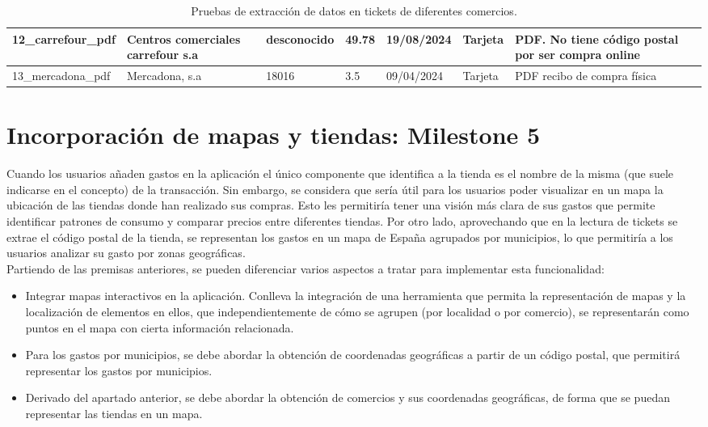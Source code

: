\begin{landscape}
\begin{table}[]
\begin{tabular}{|l|l|l|l|l|l|l|l|}
    12\_carrefour\_pdf & Centros comerciales carrefour s.a & desconocido & 49.78 & 19/08/2024 & Tarjeta & PDF. No tiene código postal por ser compra online &  \\ \hline
    13\_mercadona\_pdf & Mercadona, s.a & 18016 & 3.5 & 09/04/2024 & Tarjeta & PDF recibo de compra física &  \\ \hline
    \end{tabular}
    \caption{Pruebas de extracción de datos en tickets de diferentes comercios.}
    \label{tab:pruebas_extraccion_datos}
    \end{table}
    \end{landscape}
    


\section{Incorporación de mapas y tiendas: Milestone 5}
Cuando los usuarios añaden gastos en la aplicación el único componente que identifica a la tienda es el nombre de la misma (que suele indicarse en el concepto) de la transacción. Sin embargo, se considera que sería útil para los usuarios poder visualizar en un mapa la ubicación de las tiendas donde han realizado sus compras. Esto les permitiría tener una visión más clara de sus gastos que permite identificar patrones de consumo y comparar precios entre diferentes tiendas. Por otro lado, aprovechando que en la lectura de tickets se extrae el código postal de la tienda, se representan los gastos en un mapa de España agrupados por municipios, lo que permitiría a los usuarios analizar su gasto por zonas geográficas.\\

Partiendo de las premisas anteriores, se pueden diferenciar varios aspectos a tratar para implementar esta funcionalidad:

\begin{itemize}
    \item Integrar mapas interactivos en la aplicación. Conlleva la integración de una herramienta que permita la representación de mapas y la localización de elementos en ellos, que independientemente de cómo se agrupen (por localidad o por comercio), se representarán como puntos en el mapa con cierta información relacionada.
    \item  Para los gastos por municipios, se debe abordar la obtención de coordenadas geográficas a partir de un código postal, que permitirá representar los gastos por municipios.
    \item Derivado del apartado anterior, se debe abordar la obtención de comercios y sus coordenadas geográficas, de forma que se puedan representar las tiendas en un mapa.  
\end{itemize}


